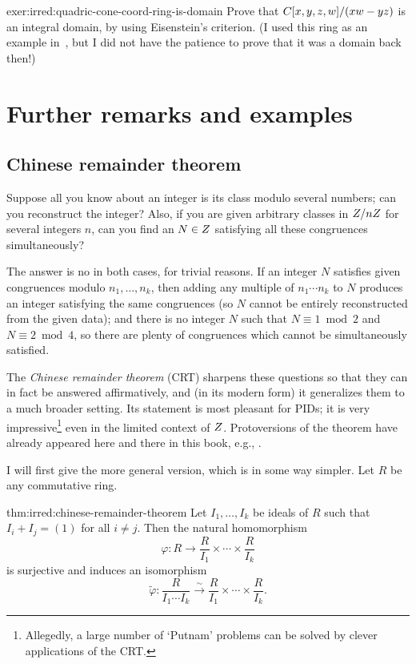 \begin{exer}{}{exer:irred:quadric-cone-coord-ring-is-domain}
  Prove that $C[x, y, z, w]/(xw - yz)$ is an integral domain, by
  using Eisenstein's criterion. (I used this ring as an example
  in~, but I did not
  have the patience to prove that it was a domain back then!)
\end{exer}

\section{Further remarks and examples}
\label{sec:irred:further-remarks-and-examples}


\subsection{Chinese remainder theorem}
\label{subsec:irred:chinese-remainder-theorem}
Suppose all you know about an integer is its class modulo several
numbers; can you reconstruct the integer? Also, if you are given
arbitrary classes in $Z/nZ$ for several integers $n$, can you find
an $N \in Z$ satisfying all these congruences simultaneously?

The answer is no in both cases, for trivial reasons. If an integer $N$
satisfies given congruences modulo $n_1, \ldots, n_k$, then adding any
multiple of $n_1 \cdots n_k$ to $N$ produces an integer satisfying the
same congruences (so $N$ cannot be entirely reconstructed from the
given data); and there is no integer $N$ such that
$N \equiv 1 \bmod 2$ and $N \equiv 2 \bmod 4$, so there are plenty of
congruences which cannot be simultaneously satisfied.

The \emph{Chinese remainder theorem} (CRT) sharpens these questions so
that they can in fact be answered affirmatively, and (in its modern
form) it generalizes them to a much broader setting. Its statement is
most pleasant for PIDs; it is very impressive\footnote{Allegedly, a
  large number of `Putnam' problems can be solved by clever
  applications of the CRT.} even in the limited context of
$Z$. Protoversions of the theorem have already appeared here and
there in this book, e.g., .

I will first give the more general version, which is in some way
simpler.  Let $R$ be any commutative ring.
\begin{thm}{}{thm:irred:chinese-remainder-theorem}
  Let $I_1, \ldots, I_k$ be ideals of $R$ such that $I_i + I_j = (1)$
  for all $i \neq j$. Then the natural homomorphism
  \[\varphi : R \longrightarrow \frac{R}{I_1} \times \cdots \times
    \frac{R}{I_k}\] is surjective and induces an isomorphism
  \[\tilde{\varphi} : \frac{R}{I_1 \cdots I_k}
    \xrightarrow{\;\sim\;} \frac{R}{I_1} \times \cdots \times
    \frac{R}{I_k}.\]
\end{thm}

